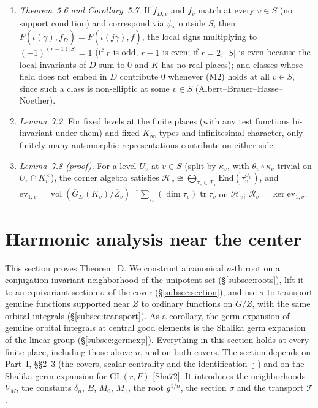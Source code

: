 \documentclass[12pt]{article}
\newcommand{\ov}[1]{\overline{#1}}
\newcommand{\tr}{\operatorname{tr}}
\newcommand{\vol}{\operatorname{vol}}
\newcommand{\GL}{\mathrm{GL}}
\newcommand{\Zb}{\ov{Z}}
\newcommand{\GDb}{\ov{G}_D}
\newcommand{\jj}{\jmath}
\newcommand{\sg}{\sigma}
\theoremstyle{plain}
\theoremstyle{definition}
\begin{document}
\begin{enumerate}[label=(I\arabic*)]
\item \emph{Theorem~5.6 and Corollary~5.7.} If $\tilde f_{D,v}$ and $\tilde f_v$ match at every $v\in S$ (no support condition) and correspond via $\psi_v$ outside $S$, then $F(\iota(\gamma),\tilde f_D)=F(\iota(j\gamma),\tilde f)$, the local signs multiplying to $(-1)^{(r-1)|S|}=1$ (if $r$ is odd, $r-1$ is even; if $r=2$, $|S|$ is even because the local invariants of $D$ sum to $0$ and $K$ has no real places); and classes whose field does not embed in $D$ contribute $0$ whenever (M2) holds at all $v\in S$, since such a class is non-elliptic at some $v\in S$ (Albert--Brauer--Hasse--Noether).
\item \emph{Lemma~7.2.} For fixed levels at the finite places (with any test functions bi-invariant under them) and fixed $K_\infty$-types and infinitesimal character, only finitely many automorphic representations contribute on either side.
\item \emph{Lemma~7.8 (proof).} For a level $U_v$ at $v\in S$ (split by $\kappa_v$, with $\tilde\theta_v\circ\kappa_v$ trivial on $U_v\cap K_v^\times$), the corner algebra satisfies $\mathcal H_v\cong\bigoplus_{\tau_v\in\mathcal T_v}\mathrm{End}(\tau_v^{U_v})$, and $\mathrm{ev}_{1,v}=\vol(\GDb(K_v)/\Zb_v)^{-1}\sum_{\tau_v}(\dim\tau_v)\tr\tau_v$ on $\mathcal H_v$; $\mathcal R_v=\ker\mathrm{ev}_{1,v}$.
\end{enumerate}

\section{Harmonic analysis near the center}\label{sec:center}
This section proves Theorem~D. We construct a canonical $n$-th root on a conjugation-invariant neighborhood of the unipotent set (\S\ref{subsec:roots}), lift it to an equivariant section $\sg$ of the cover (\S\ref{subsec:section}), and use $\sg$ to transport genuine functions supported near $\Zb$ to ordinary functions on $G/Z$, with the same orbital integrals (\S\ref{subsec:transport}). As a corollary, the germ expansion of genuine orbital integrals at central good elements is the Shalika germ expansion of the linear group (\S\ref{subsec:germexp}). Everything in this section holds at every finite place, including those above $n$, and on both covers. The section depends on Part~I, \S\S2--3 (the covers, scalar centrality and the identification $\jj$) and on the Shalika germ expansion for $\GL(r,F)$ [Sha72]. It introduces the neighborhoods $V_M$, the constants $\delta_n$, $B$, $M_0$, $M_1$, the root $g^{1/n}$, the section $\sg$ and the transport $\mathcal T$.
\end{document}
